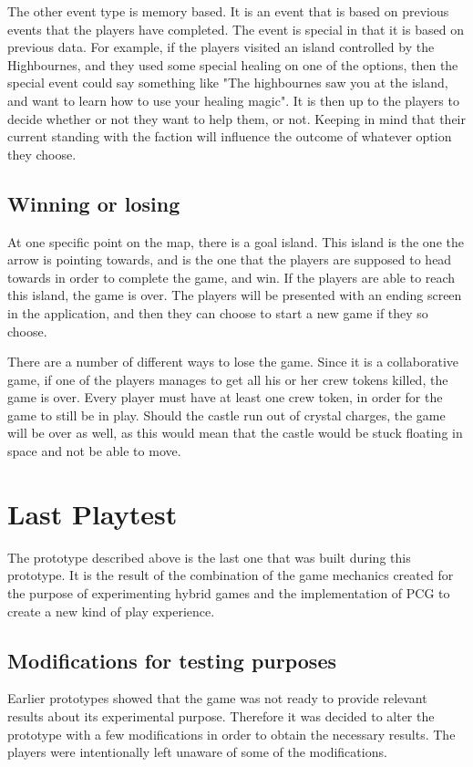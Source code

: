 The other event type is memory based. It is an event that is based on previous events that the players have completed. The event is special in that it is based on previous data. For example, if the players visited an island controlled by the Highbournes, and they used some special healing on one of the options, then the special event could say something like "The highbournes saw you at the island, and want to learn how to use your healing magic". It is then up to the players to decide whether or not they want to help them, or not. Keeping in mind that their current standing with the faction will influence the outcome of whatever option they choose. 

\subsection{Winning or losing}
At one specific point on the map, there is a goal island. This island is the one the arrow is pointing towards, and is the one that the players are supposed to head towards in order to complete the game, and win.
If the players are able to reach this island, the game is over. The players will be presented with an ending screen in the application, and then they can choose to start a new game if they so choose. 

There are a number of different ways to lose the game. Since it is a collaborative game, if one of the players manages to get all his or her crew tokens killed, the game is over. Every player must have at least one crew token, in order for the game to still be in play.
Should the castle run out of crystal charges, the game will be over as well, as this would mean that the castle would be stuck floating in space and not be able to move.

\section{Last Playtest}
The prototype described above is the last one that was built during this prototype. It is the result of the combination of the game mechanics created for the purpose of experimenting hybrid games and the implementation of PCG to create a new kind of play experience.
\subsection{Modifications for testing purposes}
Earlier prototypes showed that the game was not ready to provide relevant results about its experimental purpose. Therefore it was decided to alter the prototype with a few modifications in order to obtain the necessary results. The players were intentionally left unaware of some of the modifications.

